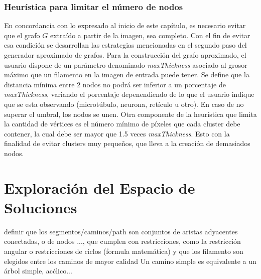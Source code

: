 \subsubsection{Heurística para limitar el n\'umero de nodos}
En concordancia con lo expresado al inicio de este cap\'itulo, es necesario evitar que el grafo $G$ extra\'ido a partir de la imagen, sea completo. Con el fin de evitar esa condici\'on se desarrollan las estrategias mencionadas en el segundo paso del generador aproximado de grafos. Para la construcci\'on del grafo aproximado, el usuario dispone de un par\'ametro denominado {\it maxThickness} asociado al grosor m\'aximo que un filamento en la imagen de entrada puede tener. Se define que la distancia m\'inima entre 2 nodos no podr\'a ser inferior a un porcentaje de {\it maxThickness}, variando el porcentaje depenendiendo de lo que el usuario indique que se esta observando (microt\'ubulo, neurona, ret\'iculo u otro). En caso de no superar el umbral, los nodos se unen. Otra componente de la heur\'istica que limita la cantidad de v\'ertices es el n\'umero m\'inimo de p\'ixeles que cada cluster debe contener, la cual debe ser mayor que 1.5 veces {\it maxThickness}. Esto con la finalidad de evitar clusters muy peque\~nos, que lleva a la creaci\'on de demasiados nodos. 

 




\section{Exploraci\'on del Espacio de Soluciones}
definir que los segmentos/caminos/path son conjuntos de aristas adyacentes conectadas, o de nodos ..., que cumplen con restricciones, como la restricción angular o restricciones de ciclos (formula matem\'atica) y que los filamento son elegidos entre los caminos de mayor calidad
Un camino simple es equivalente a un \'arbol simple, ac\'clico...


